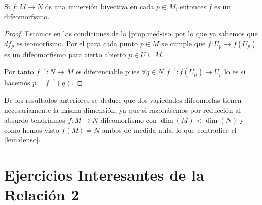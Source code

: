 \documentclass[../VD.tex]{subfiles}
\begin{document}
\begin{proposition}\label{prop:med-difeo}
Si \( f\colon M\to N \) ds una inmersión biyectiva en cada \( p\in M \), entonces \( f \) es un difeomorfismo.
\end{proposition}

\begin{proof}
Estamos en las condiciones de la \cref{prop:med-iso} por lo que ya sabemos que \( df_p \) es isomorfismo. Por el 
para cada punto \( p\in M \) se cumple que \( f\colon U_p\to f(U_p) \) es un difeomorfismo para cierto abierto \( p\in U\subseteq M \).

Por tanto \( f^{-1}\colon N\to M \) es diferenciable pues \( \forall q\in N \) \( f^{-1}\colon f(U_p)\to U_p \) lo es si hacemos \( p=f^{-1}(q) \).
\end{proof}

\begin{note}
De los resultados anteriores se deduce que dos variedades difeomorfas tienen necesariamente la misma dimensión, ya que si razonásemos por reducción al absurdo tendríamos \( f\colon M \to N \) difeomorfismo con \( \dim (M) < \dim (N) \) y como hemos visto \( f(M)=N \) ambos de medida nula, lo que contradice el \cref{lem:denso}.
\end{note}

\section{Ejercicios Interesantes de la Relación 2}
\end{document}
